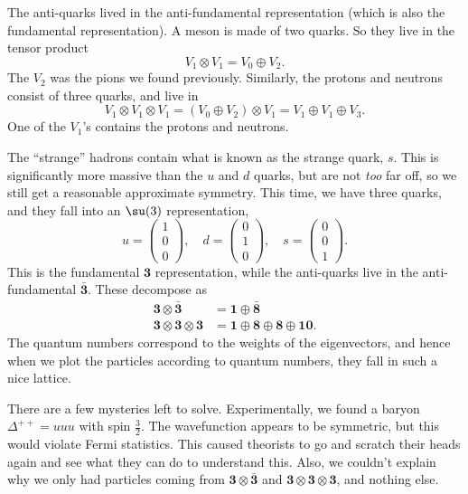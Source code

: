 \documentclass[a4paper]{article}
\begin{document}
The anti-quarks lived in the anti-fundamental representation (which is also the fundamental representation). A meson is made of two quarks. So they live in the tensor product
\[
  V_1 \otimes V_1 = V_0 \oplus V_2.
\]
The $V_2$ was the pions we found previously. Similarly, the protons and neutrons consist of three quarks, and live in
\[
  V_1 \otimes V_1 \otimes V_1 = (V_0 \oplus V_2) \otimes V_1 = V_1 \oplus V_1 \oplus V_3.
\]
One of the $V_1$'s contains the protons and neutrons.

The ``strange'' hadrons contain what is known as the strange quark, $s$. This is significantly more massive than the $u$ and $d$ quarks, but are not \emph{too} far off, so we still get a reasonable approximate symmetry. This time, we have three quarks, and they fall into an $\su(3)$ representation,
\[
  u = 
  \begin{pmatrix}
    1 \\ 0 \\ 0
  \end{pmatrix},\quad
  d =
  \begin{pmatrix}
    0 \\ 1 \\ 0
  \end{pmatrix},\quad
  s =
  \begin{pmatrix}
    0 \\ 0 \\ 1
  \end{pmatrix}.
\]
This is the fundamental $\mathbf{3}$ representation, while the anti-quarks live in the anti-fundamental $\bar{\mathbf{3}}$. These decompose as
\begin{align*}
  \mathbf{3} \otimes \bar{\mathbf{3}} &= \mathbf{1} \oplus \bar{\mathbf{8}}\\
  \mathbf{3} \otimes \mathbf{3} \otimes \mathbf{3} &= \mathbf{1} \oplus \mathbf{8} \oplus \mathbf{8} \oplus \mathbf{10}.
\end{align*}
The quantum numbers correspond to the weights of the eigenvectors, and hence when we plot the particles according to quantum numbers, they fall in such a nice lattice.

There are a few mysteries left to solve. Experimentally, we found a baryon $\Delta^{++} = uuu$ with spin $\frac{3}{2}$. The wavefunction appears to be symmetric, but this would violate Fermi statistics. This caused theorists to go and scratch their heads again and see what they can do to understand this. Also, we couldn't explain why we only had particles coming from $\mathbf{3} \otimes \bar{\mathbf{3}}$ and $\mathbf{3} \otimes \mathbf{3} \otimes \mathbf{3}$, and nothing else.
\end{document}
